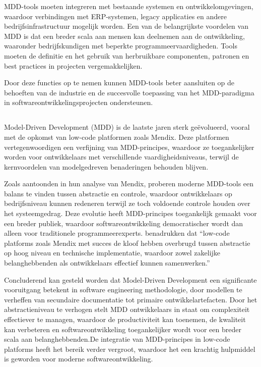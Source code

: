 MDD-tools moeten integreren met bestaande systemen en ontwikkelomgevingen, waardoor verbindingen met ERP-systemen, legacy applicaties en andere bedrijfsinfrastructuur mogelijk worden. Een van de belangrijkste voordelen van MDD is dat een breder scala aan mensen kan deelnemen aan de ontwikkeling, waaronder bedrijfskundigen met beperkte programmeervaardigheden. Tools moeten de definitie en het gebruik van herbruikbare componenten, patronen en best practices in projecten vergemakkelijken. 

Door deze functies op te nemen kunnen MDD-tools beter aansluiten op de behoeften van de industrie en de succesvolle toepassing van het MDD-paradigma in softwareontwikkelingsprojecten ondersteunen.

\subsection{}%
Model-Driven Development (MDD) is de laatste jaren sterk geëvolueerd, vooral met de opkomst van low-code platformen zoals Mendix. Deze platformen vertegenwoordigen een verfijning van MDD-principes, waardoor ze toegankelijker worden voor ontwikkelaars met verschillende vaardigheidsniveaus, terwijl de kernvoordelen van modelgedreven benaderingen behouden blijven.

Zoals \textcite{Henkel2010} aantoonden in hun analyse van Mendix, proberen moderne MDD-tools een balans te vinden tussen abstractie en controle, waardoor ontwikkelaars op bedrijfsniveau kunnen redeneren terwijl ze toch voldoende controle houden over het systeemgedrag. Deze evolutie heeft MDD-principes toegankelijk gemaakt voor een breder publiek, waardoor softwareontwikkeling democratischer wordt dan alleen voor traditionele programmeerexperts. \textcite{Henkel2010} benadrukken dat “low-code platforms zoals Mendix met succes de kloof hebben overbrugd tussen abstractie op hoog niveau en technische implementatie, waardoor zowel zakelijke belanghebbenden als ontwikkelaars effectief kunnen samenwerken.”

Concluderend kan gesteld worden dat Model-Driven Development een significante vooruitgang betekent in software engineering methodologie, door modellen te verheffen van secundaire documentatie tot primaire ontwikkelartefacten. Door het abstractieniveau te verhogen stelt MDD ontwikkelaars in staat om complexiteit effectiever te managen, waardoor de productiviteit kan toenemen, de kwaliteit kan verbeteren en softwareontwikkeling toegankelijker wordt voor een breder scala aan belanghebbenden.De integratie van MDD-principes in low-code platforms heeft het bereik verder vergroot, waardoor het een krachtig hulpmiddel is geworden voor moderne softwareontwikkeling.

